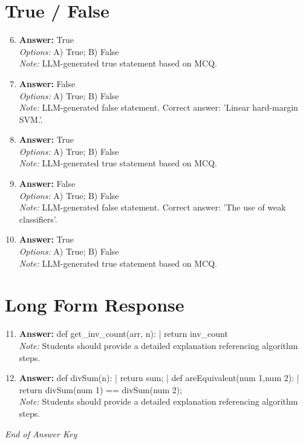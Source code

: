 \documentclass[12pt]{article}
\begin{document}
\section*{True / False}
\begin{enumerate}[label=\arabic*.]
\setcounter{enumi}{5}
\item \textbf{Answer:} True
\\ \textit{Options:} A) True; B) False
\\ \textit{Note:} LLM-generated true statement based on MCQ.
\item \textbf{Answer:} False
\\ \textit{Options:} A) True; B) False
\\ \textit{Note:} LLM-generated false statement. Correct answer: 'Linear hard-margin SVM.'.
\item \textbf{Answer:} True
\\ \textit{Options:} A) True; B) False
\\ \textit{Note:} LLM-generated true statement based on MCQ.
\item \textbf{Answer:} False
\\ \textit{Options:} A) True; B) False
\\ \textit{Note:} LLM-generated false statement. Correct answer: 'The use of weak classifiers'.
\item \textbf{Answer:} True
\\ \textit{Options:} A) True; B) False
\\ \textit{Note:} LLM-generated true statement based on MCQ.
\end{enumerate}

\section*{Long Form Response}
\begin{enumerate}[label=\arabic*.]
\setcounter{enumi}{10}
\item \textbf{Answer:} def get\_inv\_count(arr, n): | return inv\_count
\\ \textit{Note:} Students should provide a detailed explanation referencing algorithm steps.
\item \textbf{Answer:} def divSum(n): | return sum; | def areEquivalent(num 1,num 2): | return divSum(num 1) == divSum(num 2);
\\ \textit{Note:} Students should provide a detailed explanation referencing algorithm steps.
\end{enumerate}

\vfill
\noindent\textit{End of Answer Key}
\end{document}
